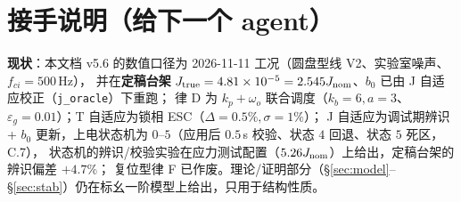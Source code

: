 \documentclass[11pt,a4paper]{article}
\theoremstyle{remark}\newtheorem{remark}{注}
\begin{document}
\section{接手说明（给下一个 agent）}\label{sec:handoff}
\noindent\textbf{现状}：本文档 v5.6 的数值口径为 2026-11-11 工况（圆盘型线 V2、实验室噪声、$f_{ci}=500$\,Hz），
并在\textbf{定稿台架} $J_{\rm true}=4.81\times10^{-5}=2.545J_{\rm nom}$、$b_0$ 已由 J 自适应校正（\texttt{j\_oracle}）下重跑；
律 D 为 $k_p+\omega_o$ 联合调度（$k_b=6,a=3$、$\varepsilon_g=0.01$）；T 自适应为锁相 ESC（$\Delta=0.5\%,\sigma=1\%$）；
J 自适应为调试期辨识 + $b_0$ 更新，上电状态机为 $0$--$5$（应用后 $0.5$\,s 校验、状态 $4$ 回退、状态 $5$ 死区，C.7），
状态机的辨识/校验实验在应力测试配置（$5.26J_{\rm nom}$）上给出，定稿台架的辨识偏差 $+4.7\%$；
复位型律 F 已作废。理论/证明部分（§\ref{sec:model}--§\ref{sec:stab}）仍在标幺一阶模型上给出，只用于结构性质。
\end{document}

